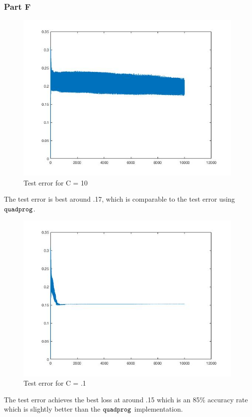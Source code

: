 \documentclass[11pt, oneside]{article}   	%
\begin{document}
\newpage{}
\subsubsection{Part F}
\begin{figure}[h!]
  \includegraphics[width=\linewidth]{test_error_10.jpg}
  \caption{Test error for C = 10}
\end{figure}
The test error is best around .17, which is comparable to the test error using $\verb!quadprog!$.
\newpage{}
\begin{figure}[h!]
  \includegraphics[width=\linewidth]{test_error_01.jpg}
  \caption{Test error for C = .1}
\end{figure}
The test error achieves the best loss at around .15 which is an 85\% accuracy rate which is slightly better than the $\verb!quadprog!$ implementation.
\newpage{}
\end{document}
